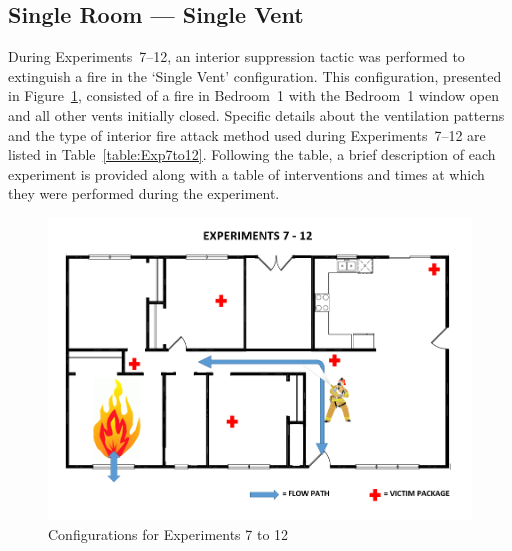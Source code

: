 \documentclass[12pt,oneside]{book}
\begin{document}
\clearpage

\subsection{Single Room --- Single Vent}
During Experiments~7--12, an interior suppression tactic was performed to extinguish a fire in the `Single Vent' configuration. This configuration, presented in Figure~\ref{fig:Single_Vent_int}, consisted of a fire in Bedroom~1 with the Bedroom~1 window open and all other vents initially closed. Specific details about the ventilation patterns and the type of interior fire attack method used during Experiments~7--12 are listed in Table~\ref{table:Exp7to12}. Following the table, a brief description of each experiment is provided along with a table of interventions and times at which they were performed during the experiment. 

\begin{figure}[!ht]
	\centering
	\includegraphics[width=5in]{Figures/General/Exps7through12.png}
	\caption{Configurations for Experiments 7 to 12}
	\label{fig:Single_Vent_int}
\end{figure}
\end{document}
